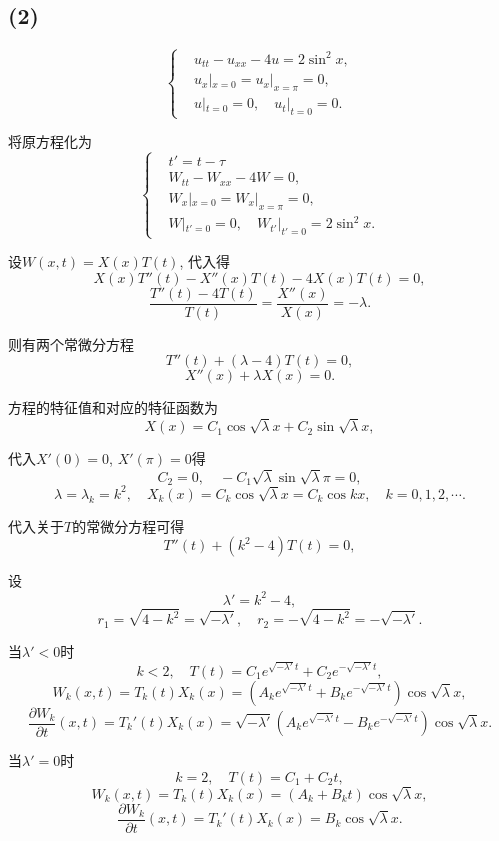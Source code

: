 \documentclass[11pt,a4paper]{article}
\begin{document}
\subsection*{(2)}
\begin{problem}
$$
  \left\{\begin{aligned}
     & u_{tt}-u_{xx}-4u=2\sin^2x,     \\
     & u_x|_{x=0}=u_x|_{x=\pi}=0,     \\
     & u|_{t=0}=0,\quad u_t|_{t=0}=0.
  \end{aligned}\right.
$$
\end{problem}


将原方程化为
$$
  \left\{\begin{aligned}
     & t'=t-\tau                                  \\
     & W_{tt}-W_{xx}-4W=0,                        \\
     & W_x|_{x=0}=W_x|_{x=\pi}=0,                 \\
     & W|_{t'=0}=0,\quad W_{t'}|_{t'=0}=2\sin^2x.
  \end{aligned}\right.
$$

设$W(x,t)=X(x)T(t)$, 代入得
$$X(x)T''(t)-X''(x)T(t)-4X(x)T(t)=0,$$
$$\frac{T''(t)-4T(t)}{T(t)}=\frac{X''(x)}{X(x)}=-\lambda.$$

则有两个常微分方程
$$T''(t)+(\lambda-4)T(t)=0,$$
$$X''(x)+\lambda X(x)=0.$$

方程的特征值和对应的特征函数为
$$X(x)=C_1\cos\sqrt{\lambda}x+C_2\sin\sqrt{\lambda}x,$$

代入$X'(0)=0$, $X'(\pi)=0$得
$$C_2=0,\quad -C_1\sqrt{\lambda}\sin\sqrt{\lambda}\pi=0,$$
$$\lambda=\lambda_k=k^2,\quad X_k(x)=C_k\cos\sqrt{\lambda}x=C_k\cos kx,\quad k=0,1,2,\cdots.$$

代入关于$T$的常微分方程可得
$$T''(t)+(k^2-4)T(t)=0,$$

设$$\lambda'=k^2-4,$$
$$r_1=\sqrt{4-k^2}=\sqrt{-\lambda'},\quad r_2=-\sqrt{4-k^2}=-\sqrt{-\lambda'}.$$

当$\lambda'<0$时
$$k<2,\quad T(t)=C_1e^{\sqrt{-\lambda'}t}+C_2e^{-\sqrt{-\lambda'}t},$$
$$W_k(x,t)=T_k(t)X_k(x)=(A_ke^{\sqrt{-\lambda'}t}+B_ke^{-\sqrt{-\lambda'}t})\cos\sqrt{\lambda}x,$$
$$\frac{\partial W_k}{\partial t}(x,t)=T_k'(t)X_k(x)=\sqrt{-\lambda'}(A_ke^{\sqrt{-\lambda'}t}-B_ke^{-\sqrt{-\lambda'}t})\cos\sqrt{\lambda}x.$$

当$\lambda'=0$时
$$k=2,\quad T(t)=C_1+C_2t,$$
$$W_k(x,t)=T_k(t)X_k(x)=(A_k+B_kt)\cos\sqrt{\lambda}x,$$
$$\frac{\partial W_k}{\partial t}(x,t)=T_k'(t)X_k(x)=B_k\cos\sqrt{\lambda}x.$$
\end{document}
